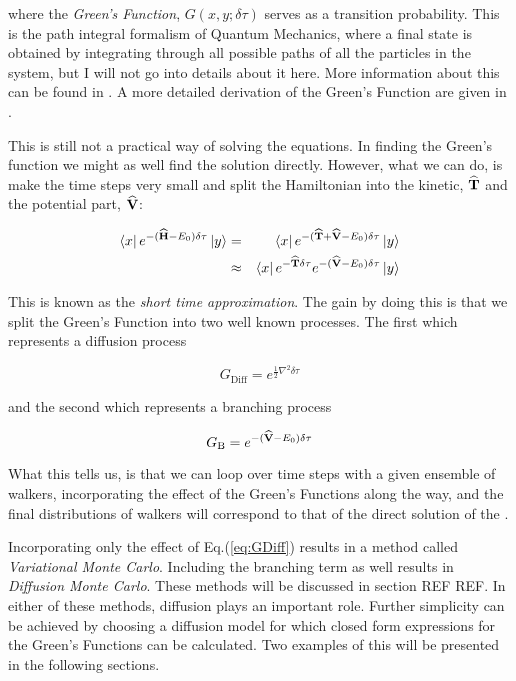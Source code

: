 where the \textit{Green's Function}, $G(x, y; \delta\tau)$ serves as a transition probability. This is the path integral formalism of Quantum Mechanics, where a final state is obtained by integrating through all possible paths of all the particles in the system, but I will not go into details about it here. More information about this can be found in \cite{leinaas}. A more detailed derivation of the Green's Function are given in \cite{abInitioMC}.

This is still not a practical way of solving the equations. In finding the Green's function we might as well find the solution directly. However, what we can do, is make the time steps very small and split the Hamiltonian into the kinetic, ${\bf\widehat{T}}$ and the potential part, ${\bf\widehat{V}}$:

\begin{eqnarray}
 \left< x \right|e^{-({\bf\widehat{H}} - E_0)\delta\tau}\left| y \right> &=& \left< x \right|e^{-({\bf\widehat{T}} + {\bf\widehat{V}} - E_0)\delta\tau}\left| y \right> \nonumber \\
                                             &\approx& \left< x \right|e^{-{\bf\widehat{T}}\delta\tau}e^{-({\bf\widehat{V}} - E_0)\delta\tau}\left| y \right>
\end{eqnarray}

This is known as the \textit{short time approximation}. The gain by doing this is that we split the Green's Function into two well known processes. The first which represents a diffusion process

\begin{equation}
\label{eq:GDiff}
 G_\mathrm{Diff} = e^{\frac{1}{2}\nabla^2\delta\tau}
\end{equation}

and the second which represents a branching process

\begin{equation}
 \label{eq:GB}
 G_\mathrm{B} = e^{-({\bf\widehat{V}} - E_0)\delta\tau}
\end{equation}

What this tells us, is that we can loop over time steps with a given ensemble of walkers, incorporating the effect of the Green's Functions along the way, and the final distributions of walkers will correspond to that of the direct solution of the \schrodinger. 

Incorporating only the effect of Eq.(\ref{eq:GDiff}) results in a method called \textit{Variational Monte Carlo}. Including the branching term as well results in \textit{Diffusion Monte Carlo}. These methods will be discussed in section REF REF. In either of these methods, diffusion plays an important role. Further simplicity can be achieved by choosing a diffusion model for which closed form expressions for the Green's Functions can be calculated. Two examples of this will be presented in the following sections.



